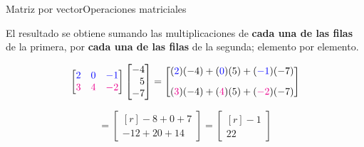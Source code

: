 \documentclass[spanish, c]{beamer}
\begin{document}
\begin{frame}{Matriz por vector}{Operaciones matriciales}    

    El resultado se obtiene sumando las multiplicaciones de \textbf{cada una de las filas} de la primera, por \textbf{cada una de las filas} de la segunda; elemento por elemento.

    \[%
        \begin{bmatrix*}[r]
            {\color{blue} 2} & {\color{blue} 0} & {\color{blue} -1}\\
            {\color{magenta} 3} & {\color{magenta} 4} & {\color{magenta} -2}
        \end{bmatrix*}
        \begin{bmatrix*}[r]
            -4 \\
            5 \\
            -7
        \end{bmatrix*} =
        \begin{bmatrix*}[r]
            {({\color{blue} 2})}(-4) + {({\color{blue} 0})}(5) + {({\color{blue} -1})}(-7) \\[2ex]
            {({\color{magenta} 3})}(-4) + {({\color{magenta} 4})}(5) + {({\color{magenta} -2})}(-7)
        \end{bmatrix*}
    \]

    \bigskip

    \[%
        =
        \begin{bmatrix*}[r]
            -8 + 0 + 7 \\
            -12 + 20 +14
        \end{bmatrix*} =
        \begin{bmatrix*}[r]
            -1 \\
            22
        \end{bmatrix*}
    \]
\end{frame}
\end{document}
